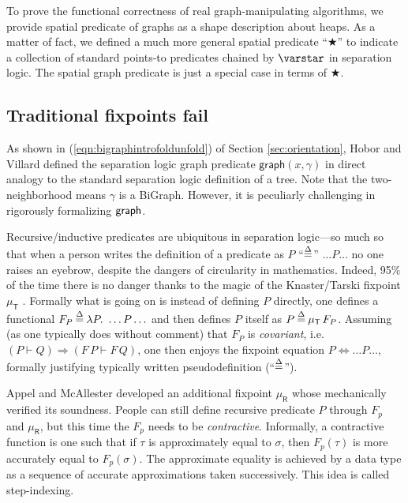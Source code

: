 To prove the functional correctness of real graph-manipulating
algorithms, we provide spatial predicate of graphs as a shape
description about heaps. As a matter of fact, we defined a much more
general spatial predicate ``$\bigstar$'' to indicate a collection of
standard points-to predicates chained by $\scon$ in separation
logic. The spatial graph predicate is just a special case in terms of
$\bigstar$.



\subsection{Traditional fixpoints fail}\label{sec:fixpointfail}

As shown in (\ref{eqn:bigraphintrofoldunfold}) of Section
\ref{sec:orientation}, Hobor and Villard\cite{hobor:ramification}
defined the separation logic graph predicate
$\mathsf{graph}(x,\gamma)$ in direct analogy to the standard
separation logic definition of a tree. Note that the two-neighborhood
means $\gamma$ is a BiGraph. However, it is peculiarly challenging in
rigorously formalizing $\mathsf{graph}$.


Recursive/inductive predicates are ubiquitous in separation logic---so
much so that when a person writes the definition of a predicate as $P$
``$\mathbin{\stackrel{\Delta}{=}}$'' $\ldots P \ldots$ no one raises an eyebrow, despite the
dangers of circularity in mathematics. Indeed, 95\% of the time there
is no danger thanks to the magic of the Knaster/Tarski fixpoint
$\mu_{\mathsf{T}}$ \cite{tarski:fixpoint}. Formally what is going on
is instead of defining $P$ directly, one defines a functional $F_P
\mathbin{\stackrel{\Delta}{=}} \lambda P.~ \ldots P \ldots$ and then defines $P$ itself as $P
\mathbin{\stackrel{\Delta}{=}} \mu_{\mathsf{T}} \, F_P$.  Assuming (as one typically does
without comment) that $F_P$ is \emph{covariant}, i.e. $(P \vdash Q)
\Rightarrow (F \, P \vdash F \, Q)$, one then enjoys the fixpoint
equation $P \Leftrightarrow \ldots P \ldots$, formally justifying
typically written pseudodefinition (``$\mathbin{\stackrel{\Delta}{=}}$'').

Appel and McAllester developed an additional fixpoint
$\mu_{\mathsf{R}}$ \cite{appel:fixpoint} whose \cite{appel:vmm}
mechanically verified its soundness. People can still define recursive
predicate $P$ through $F_p$ and $\mu_{\mathsf{R}}$, but this time the
$F_p$ needs to be \emph{contractive}. Informally, a contractive
function is one such that if $\tau$ is approximately equal to
$\sigma$, then $F_p(\tau)$ is more accurately equal to
$F_p(\sigma)$. The approximate equality is achieved by a data type as
a sequence of accurate approximations taken successively. This idea is
called step-indexing.

